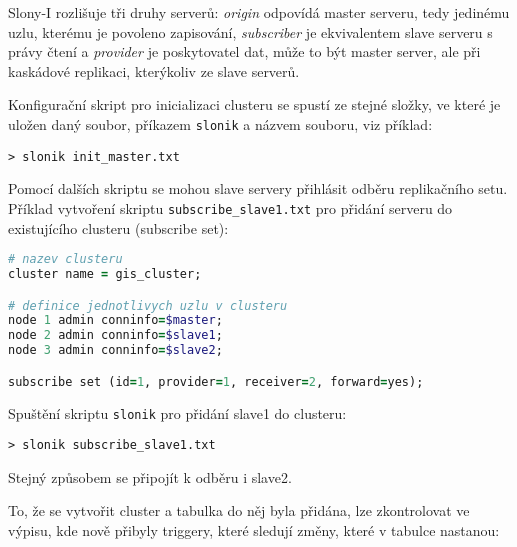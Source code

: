 Slony-I rozlišuje tři druhy serverů:
{\it origin} odpovídá master serveru, tedy jedinému uzlu, kterému je povoleno zapisování,
{\it subscriber} je ekvivalentem slave serveru s právy čtení a 
{\it provider} je poskytovatel dat, může to být master server, ale při kaskádové replikaci, kterýkoliv ze slave serverů. 

Konfigurační skript pro inicializaci clusteru se spustí ze stejné složky, ve které je uložen daný soubor, příkazem \texttt{slonik} a názvem souboru, viz příklad:

\begin{lstlisting}
> slonik init_master.txt
\end{lstlisting}

Pomocí dalších skriptu se mohou slave servery přihlásit odběru replikačního setu. Příklad vytvoření skriptu \texttt{subscribe\_slave1.txt} pro přidání serveru do existujícího clusteru (subscribe set):

\begin{lstlisting}[language=ruby]
# nazev clusteru
cluster name = gis_cluster;

# definice jednotlivych uzlu v clusteru
node 1 admin conninfo=$master;
node 2 admin conninfo=$slave1;
node 3 admin conninfo=$slave2;

subscribe set (id=1, provider=1, receiver=2, forward=yes);
\end{lstlisting}

Spuštění skriptu \texttt{slonik} pro přidání slave1 do clusteru:

\begin{lstlisting}
> slonik subscribe_slave1.txt
\end{lstlisting}

Stejný způsobem se připojít k odběru i slave2.

To, že se vytvořit cluster a tabulka do něj byla přidána, lze zkontrolovat ve výpisu, kde nově přibyly triggery, které sledují změny, které v tabulce nastanou:

